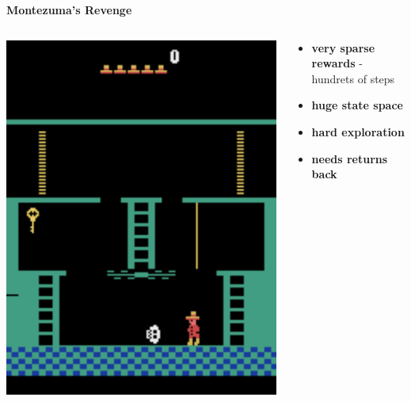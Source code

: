 \documentclass{beamer}
\begin{document}
  \begin{frame}{\bf Montezuma's Revenge}
  
    \begin{columns}
  
      \begin{column}{0.5\textwidth}
        \includegraphics[scale=0.32]{../images/montezuma.png}
      \end{column}
  
      \begin{column}{0.5\textwidth}
        \begin{itemize}
          \item {\bf very sparse rewards} - hundrets of steps
          \item {\bf huge state space}
          \item {\bf hard exploration}
          \item {\bf needs returns back}
        \end{itemize}
      \end{column}
  
  
    \end{columns}
  
  \end{frame}
  
\end{document}
